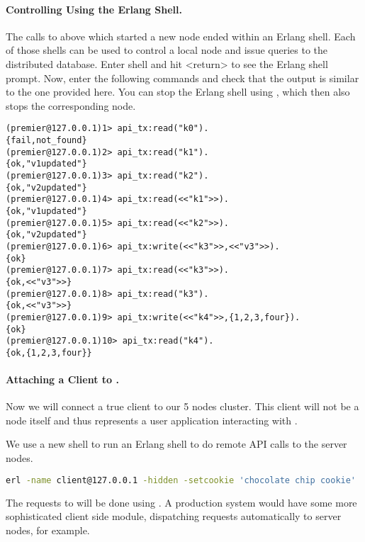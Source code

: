 \paragraph{Controlling \scalaris{}  Using the Erlang Shell.}
The calls to  above which started a new \scalaris{} node
ended within an Erlang shell. Each of those shells can be used to control a
local \scalaris{} node and issue queries to the distributed database. Enter
shell  and hit <return> to see the Erlang shell prompt. Now, enter
the following commands and check that the output is similar to the one
provided here. You can stop the Erlang shell using , which
then also stops the corresponding \scalaris{} node.

\begin{lstlisting}
(premier@127.0.0.1)1> api_tx:read("k0").
{fail,not_found}
(premier@127.0.0.1)2> api_tx:read("k1").
{ok,"v1updated"}
(premier@127.0.0.1)3> api_tx:read("k2").
{ok,"v2updated"}
(premier@127.0.0.1)4> api_tx:read(<<"k1">>).
{ok,"v1updated"}
(premier@127.0.0.1)5> api_tx:read(<<"k2">>).
{ok,"v2updated"}
(premier@127.0.0.1)6> api_tx:write(<<"k3">>,<<"v3">>).
{ok}
(premier@127.0.0.1)7> api_tx:read(<<"k3">>).
{ok,<<"v3">>}
(premier@127.0.0.1)8> api_tx:read("k3").
{ok,<<"v3">>}
(premier@127.0.0.1)9> api_tx:write(<<"k4">>,{1,2,3,four}).
{ok}
(premier@127.0.0.1)10> api_tx:read("k4").
{ok,{1,2,3,four}}
\end{lstlisting}

\paragraph{Attaching a Client to \scalaris{}.}
Now we will connect a true client to our 5 nodes \scalaris{} cluster. This
client will not be a \scalaris{} node itself and thus represents a user
application interacting with \scalaris{}.

We use a new shell to run an Erlang shell to do remote API calls to the
server nodes.

\begin{lstlisting}[language=sh]
erl -name client@127.0.0.1 -hidden -setcookie 'chocolate chip cookie'
\end{lstlisting}

The requests to \scalaris{} will be done using . A
production system would have some more sophisticated client side module,
dispatching requests automatically to server nodes, for example.

